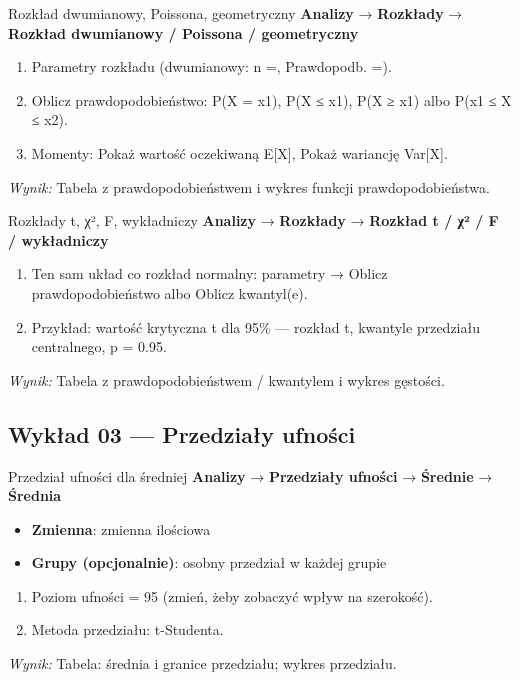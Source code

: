 \documentclass[
  polish,
  10pt,
  a4paper,
  DIV=11,
  numbers=noendperiod]{scrartcl}
\newcommand{\jmenu}[1]{{\color{upwraccent}\small #1}}
\begin{document}
\begin{jbox}{Rozkład dwumianowy, Poissona, geometryczny}\label{w:rozklady-dyskretne}
\jmenu{\textbf{Analizy} → \textbf{Rozkłady} → \textbf{Rozkład dwumianowy / Poissona / geometryczny}}

\begin{enumerate}
\item Parametry rozkładu (dwumianowy: n =, Prawdopodb. =).
\item Oblicz prawdopodobieństwo: P(X = x1), P(X ≤ x1), P(X ≥ x1) albo P(x1 ≤ X ≤ x2).
\item Momenty: Pokaż wartość oczekiwaną E[X], Pokaż wariancję Var[X].
\end{enumerate}
\textit{Wynik:} Tabela z prawdopodobieństwem i wykres funkcji prawdopodobieństwa.

\end{jbox}

\begin{jbox}{Rozkłady t, χ², F, wykładniczy}\label{w:rozklady-ciagle}
\jmenu{\textbf{Analizy} → \textbf{Rozkłady} → \textbf{Rozkład t / χ² / F / wykładniczy}}

\begin{enumerate}
\item Ten sam układ co rozkład normalny: parametry → Oblicz prawdopodobieństwo albo Oblicz kwantyl(e).
\item Przykład: wartość krytyczna t dla 95\% — rozkład t, kwantyle przedziału centralnego, p = 0.95.
\end{enumerate}
\textit{Wynik:} Tabela z prawdopodobieństwem / kwantylem i wykres gęstości.

\end{jbox}


\subsection{Wykład 03 --- Przedziały
ufności}\label{wykux142ad-03-przedziaux142y-ufnoux15bci}

\begin{jbox}{Przedział ufności dla średniej}\label{w:ci-srednia}
\jmenu{\textbf{Analizy} → \textbf{Przedziały ufności} → \textbf{Średnie} → \textbf{Średnia}}

\begin{itemize}
\item[$\triangleright$] \textbf{Zmienna}: zmienna ilościowa
\item[$\triangleright$] \textbf{Grupy (opcjonalnie)}: osobny przedział w każdej grupie
\end{itemize}
\begin{enumerate}
\item Poziom ufności = 95 (zmień, żeby zobaczyć wpływ na szerokość).
\item Metoda przedziału: t-Studenta.
\end{enumerate}
\textit{Wynik:} Tabela: średnia i granice przedziału; wykres przedziału.

\end{jbox}
\end{document}
